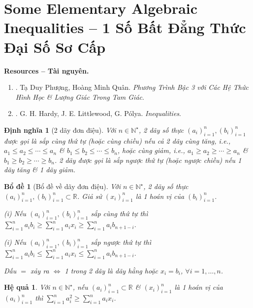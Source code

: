 \documentclass{article}
\newtheorem{bode}{Bổ đề}
\newtheorem{dinhnghia}{Định nghĩa}
\newtheorem{hequa}{Hệ quả}
\begin{document}

\section{Some Elementary Algebraic Inequalities -- 1 Số Bất Đẳng Thức Đại Số Sơ Cấp}
\textbf{\textsf{Resources -- Tài nguyên.}}
\begin{enumerate}
	\item \cite[Chap. 1, \S1.1: Các bất đẳng thức đại số quan trọng]{Phuong_Quan_ptb3_htl}. {\sc Tạ Duy Phượng, Hoàng Minh Quân}. {\it Phương Trình Bậc 3 với Các Hệ Thức Hình Học \& Lượng Giác Trong Tam Giác}.
	\item \cite{Hardy_Littlewood_Polya1952}. {\sc G. H. Hardy, J. E. Littlewood, G. P\'{o}lya}. {\it Inequalities}.
\end{enumerate}

\begin{dinhnghia}[2 dãy đơn điệu]
	Với $n\in\mathbb{N}^\star$, 2 dãy số thực $(a_i)_{i=1}^n,(b_i)_{i=1}^n$ được gọi là \emph{sắp cùng thứ tự} (hoặc \emph{cùng chiều}) nếu cả 2 dãy cùng tăng, i.e., $a_1\le a_2\le\cdots\le a_n$ \& $b_1\le b_2\le\cdots\le b_n$, hoặc cùng giảm, i.e., $a_1\ge a_2\ge\cdots\ge a_n$ \& $b_1\ge b_2\ge\cdots\ge b_n$. 2 dãy được gọi là \emph{sắp ngược thứ tự} (hoặc \emph{ngược chiều}) nếu 1 dãy tăng \& 1 dãy giảm.
\end{dinhnghia}

\begin{bode}[Bổ đề về dãy đơn điệu]
	Với $n\in\mathbb{N}^\star$, 2 dãy số thực $(a_i)_{i=1}^n,(b_i)_{i=1}^n\subset\mathbb{R}$. Giả sử $(x_i)_{i=1}^n$ là 1 hoán vị của $(b_i)_{i=1}^n$.
	\item(i) Nếu $(a_i)_{i=1}^n,(b_i)_{i=1}^n$ sắp cùng thứ tự thì $\sum_{i=1}^n a_ib_i\ge\sum_{i=1}^n a_ix_i\ge\sum_{i=1}^n a_ib_{n + 1 - i}$.
	\item(i) Nếu $(a_i)_{i=1}^n,(b_i)_{i=1}^n$ sắp ngược thứ tự thì $\sum_{i=1}^n a_ib_i\le\sum_{i=1}^n a_ix_i\le\sum_{i=1}^n a_ib_{n + 1 - i}$.
	
	Dấu $=$ xảy ra $\Leftrightarrow$ 1 trong 2 dãy là dãy hằng hoặc $x_i = b_i$, $\forall i = 1,\ldots,n$.
\end{bode}

\begin{hequa}
	Với $n\in\mathbb{N}^\star$, nếu $(a_i)_{i=1}^n\subset\mathbb{R}$ \& $(x_i)_{i=1}^n$ là 1 hoán vị của $(a_i)_{i=1}^n$ thì $\sum_{i=1}^n a_i^2\ge\sum_{i=1}^n a_ix_i$.
\end{hequa}
\end{document}
